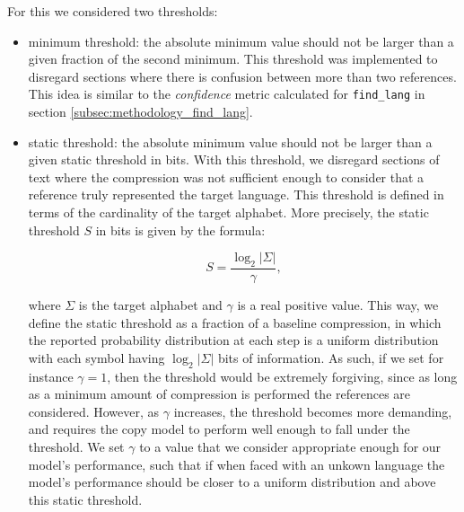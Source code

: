 \documentclass{article}
\begin{document}
For this we considered two thresholds:
\begin{itemize}
    \item minimum threshold: the absolute minimum value should not be larger than a given fraction of the second minimum. This threshold was implemented to disregard sections where there is confusion between more than two references. This idea is similar to the \textit{confidence} metric calculated for \verb|find_lang| in section \ref{subsec:methodology_find_lang}.
    \item static threshold: the absolute minimum value should not be larger than a given static threshold in bits. With this threshold, we disregard sections of text where the compression was not sufficient enough to consider that a reference truly represented the target language.
    This threshold is defined in terms of the cardinality of the target alphabet.
    More precisely, the static threshold $S$ in bits is given by the formula:

    \begin{equation}
        \label{eq:locate_lang_static_threshold}
        S = \frac{\log_2 |\Sigma|}{\gamma},
    \end{equation}

    where $\Sigma$ is the target alphabet and $\gamma$ is a real positive value.
    This way, we define the static threshold as a fraction of a baseline compression, in which the reported probability distribution at each step is a uniform distribution with each symbol having $\log_2 |\Sigma|$ bits of information.
    As such, if we set for instance $\gamma = 1$, then the threshold would be extremely forgiving, since as long as a minimum amount of compression is performed the references are considered.
    However, as $\gamma$ increases, the threshold becomes more demanding, and requires the copy model to perform well enough to fall under the threshold.
    We set $\gamma$ to a value that we consider appropriate enough for our model's performance, such that if when faced with an unkown language the model's performance should be closer to a uniform distribution and above this static threshold.
\end{itemize}
\end{document}
